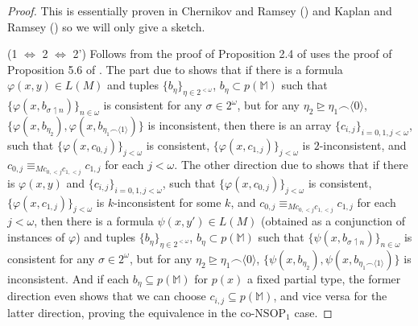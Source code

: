 \documentclass[12pt]{amsart}
\theoremstyle{definition}
\begin{document}
\begin{proof}
     This is essentially proven in Chernikov and Ramsey (\cite{CR15}) and Kaplan and Ramsey (\cite{KR17}) so we will only give a sketch.


    (1 $\Leftrightarrow$ 2 $\Leftrightarrow$ 2') Follows from the proof of Proposition 2.4 of \cite{CR15}  uses the proof of Proposition 5.6 of \cite{CR15}. The part due to \cite{CR15} shows that if there is a formula $\varphi(x, y) \in L(M)$ and tuples $\{b_{\eta}\}_{\eta \in 2^{<\omega}}$, $b_{\eta} \subset p(\mathbb{M})$ such that $\{\varphi(x, b_{\sigma \upharpoonleft n})\}_{n \in \omega}$ is consistent for any $\sigma \in 2^{\omega}$, but for any $\eta_{2} \unrhd \eta_{1} \smallfrown \langle 0\rangle$, $\{\varphi(x, b_{\eta_{2}}), \varphi(x, b_{\eta_{1} \smallfrown \langle 1\rangle})\}$ is inconsistent, then there is an array $\{c_{i, j}\}_{i = 0, 1, j< \omega}$, such that $\{\varphi(x, c_{0, j})\}_{j < \omega}$ is consistent, $\{\varphi(x, c_{1, j})\}_{j < \omega}$ is $2$-inconsistent, and $c_{0, j} \equiv_{Mc_{0, < j}c_{1, < j}} c_{1, j}$ for each $j < \omega$. The other direction due to \cite{KR17} shows that if there is $\varphi(x, y)$ and $\{c_{i, j}\}_{i = 0, 1, j< \omega}$, such that $\{\varphi(x, c_{0, j})\}_{j < \omega}$ is consistent, $\{\varphi(x, c_{1, j})\}_{j < \omega}$ is $k$-inconsistent for some $k$, and $c_{0, j} \equiv_{Mc_{0, < j}c_{1, < j}} c_{1, j}$ for each $j < \omega$, then there is a formula $\psi(x, y') \in L(M)$ (obtained as a conjunction of instances of $\varphi$) and tuples $\{b_{\eta}\}_{\eta \in 2^{<\omega}}$, $b_{\eta} \subset p(\mathbb{M})$ such that $\{\psi(x, b_{\sigma \upharpoonleft n})\}_{n \in \omega}$ is consistent for any $\sigma \in 2^{\omega}$, but for any $\eta_{2} \unrhd \eta_{1} \smallfrown \langle 0\rangle$, $\{\psi(x, b_{\eta_{2}}), \psi(x, b_{\eta_{1} \smallfrown \langle 1\rangle})\}$ is inconsistent. And if each $b_{\eta} \subseteq p(\mathbb{M})$ for $p(x)$ a fixed partial type, the former direction even shows that we can choose $c_{i, j} \subseteq p(\mathbb{M})$, and vice versa for the latter direction, proving the equivalence in the co-$\mathrm{NSOP}_{1}$ case.


\end{proof}
\end{document}
